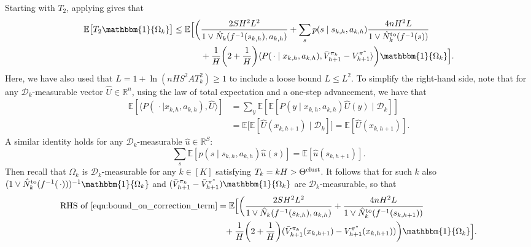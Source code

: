 \documentclass[11pt]{article}
\newcommand{\mcD}{\mathcal{D}}
\newcommand{\mbbE}{\mathbb{E}}
\newcommand{\mbbR}{\mathbb{R}}
\newcommand{\clust}{\textnormal{clust}}
\theoremstyle{definition}
\theoremstyle{definition}
\begin{document}
Starting with $T_2$, applying  gives that
\begin{align}
	\mbbE\bigl[
		T_2
		\mathbbm{1}\{\Omega_k\}
		\bigr]
	\nonumber
	\leq
	\mbbE\Bigl[
	\biggl(
	 &
	\frac{2SH^2L^2}{1\vee \hat{N}_k(f^{-1}(s_{k,h}),a_{k,h})}
	+
	\sum_{s}
	p(s\mid s_{k,h},a_{k,h})\frac{4n H^2L}{1\vee \hat{N}^{\mathrm{to}}_k(f^{-1}(s))}
	\nonumber
	\\
	 &
	+
	\frac{1}{H}
	\biggl(2+\frac{1}{H}\biggr)\langle P(\,\cdot \mid x_{k,h},a_{k,h}), \bar{V}^{\pi_k}_{h+1} - V^{\pi^*}_{h+1}\rangle
	\biggr)
	\mathbbm{1}\{\Omega_k\}
	\Bigr]
	.
	\label{eqn:bound_on_correction_term}
\end{align}
Here, we have also used that $L=1+\ln(nHS^2AT_k^2)\geq 1$ to include a loose bound $L\leq L^2$.
To simplify the right-hand side, note that for any $\mcD_k$-measurable vector $\hat{U}\in\mbbR^n$, using the law of total expectation and a one-step advancement, we have that
\begin{equation}
	\begin{split}
		\mbbE[\langle P(\,\cdot \mid x_{k,h},a_{k,h}), \hat{U}\rangle ]
		 &
		=
		\sum_{y}
		\mbbE[ \mbbE[P(y\mid x_{k,h},a_{k,h})\hat{U}(y)\mid \mcD_k] ]
		\\
		 &
		=
		\mbbE
		\bigl[
			\mbbE[\hat{U}(x_{k,h+1})\mid \mcD_k]
			\bigr]
		=
		\mbbE[\hat{U}(x_{k,h+1})].
	\end{split}
\end{equation}
A similar identity holds for any $\mcD_k$-measurable $\hat{u}\in\mbbR^S$:
\begin{equation}
	\label{eqn:next_latent_state_expectation}
	\sum_{s}
	\mbbE[ p(s\mid s_{k,h},a_{k,h}) \hat{u}(s) ] = \mbbE[\hat{u}(s_{k,h+1})].
\end{equation}
Then recall that $\Omega_k$ is $\mcD_k$-measurable for any $k\in[K]$ satisfying $T_k=kH>\Theta^{\clust}$.
It follows that for such $k$ also $(1\vee \hat{N}^{\mathrm{to}}_k(f^{-1}(\,\cdot )))^{-1}\mathbbm{1}\{\Omega_k\}$ and $(\bar{V}^{\pi_k}_{h+1}- \bar{V}^{\pi^*}_{h+1})\mathbbm{1}\{\Omega_k\}$ are $\mcD_k$-measurable, so that
\begin{align}
	\textnormal{RHS of }\eqref{eqn:bound_on_correction_term}
	 &
	=
	\mbbE\Bigl[
	\biggl(
	\frac{2SH^2L^2}{1\vee \hat{N}_k(f^{-1}(s_{k,h}),a_{k,h})}
	+
	\frac{4n H^2L}{1\vee \hat{N}^{\mathrm{to}}_k(f^{-1}(s_{k,h+1}))}
	\nonumber
	\\
	 &
	\phantom{=}
	+
	\frac{1}{H}
	\biggl(2+\frac{1}{H}\biggr)(\bar{V}^{\pi_k}_{h+1}(x_{k,h+1}) - V^{\pi^*}_{h+1}(x_{k,h+1}))
	\biggr)
	\mathbbm{1}\{\Omega_k\}
	\Bigr]
	.
	\label{eqn:bound_on_expected_correction_term}
\end{align}
\end{document}
